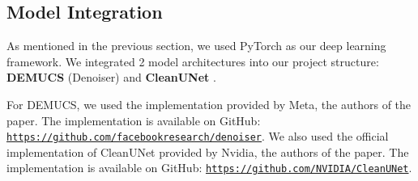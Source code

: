 \subsection{Model Integration}

As mentioned in the previous section, we used PyTorch as our deep learning framework. We integrated 2 model architectures into our project structure: \textbf{DEMUCS} (Denoiser) \cite{defossez2020} and \textbf{CleanUNet} \cite{kong2022}.

For DEMUCS, we used the implementation provided by Meta, the authors of the paper. The implementation is available on GitHub: \texttt{\url{https://github.com/facebookresearch/denoiser}}. We also used the official implementation of CleanUNet provided by Nvidia, the authors of the paper. The implementation is available on GitHub: \texttt{\url{https://github.com/NVIDIA/CleanUNet}}.